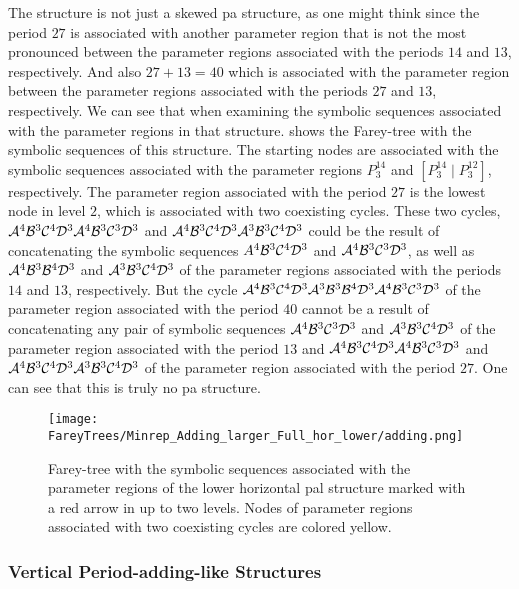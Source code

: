 The structure is not just a skewed \gls{pa} structure, as one might think since the period $27$ is associated with another parameter region that is not the most pronounced between the parameter regions associated with the periods $14$ and $13$, respectively.
And also $27 + 13 = 40$ which is associated with the parameter region between the parameter regions associated with the periods $27$ and $13$, respectively.
We can see that when examining the symbolic sequences associated with the parameter regions in that structure.
 shows the Farey-tree with the symbolic sequences of this structure.
The starting nodes are associated with the symbolic sequences associated with the parameter regions $P^{14}_3$ and $\left[P^{14}_3 \mid P^{12}_3\right]$, respectively.
The parameter region associated with the period $27$ is the lowest node in level $2$, which is associated with two coexisting cycles.
These two cycles, $\mathcal{A}^4\mathcal{B}^3\mathcal{C}^4\mathcal{D}^3\mathcal{A}^4\mathcal{B}^3\mathcal{C}^3\mathcal{D}^3$ and $\mathcal{A}^4\mathcal{B}^3\mathcal{C}^4\mathcal{D}^3\mathcal{A}^3\mathcal{B}^3\mathcal{C}^4\mathcal{D}^3$ could be the result of concatenating the symbolic sequences $A^4\mathcal{B}^3\mathcal{C}^4\mathcal{D}^3$ and $\mathcal{A}^4\mathcal{B}^3\mathcal{C}^3\mathcal{D}^3$, as well as $\mathcal{A}^4\mathcal{B}^3\mathcal{B}^4\mathcal{D}^3$ and $\mathcal{A}^3\mathcal{B}^3\mathcal{C}^4\mathcal{D}^3$ of the parameter regions associated with the periods $14$ and $13$, respectively.
But the cycle $\mathcal{A}^4\mathcal{B}^3\mathcal{C}^4\mathcal{D}^3\mathcal{A}^3\mathcal{B}^3\mathcal{B}^4\mathcal{D}^3\mathcal{A}^4\mathcal{B}^3\mathcal{C}^3\mathcal{D}^3$ of the parameter region associated with the period $40$ cannot be a result of concatenating any pair of symbolic sequences $\mathcal{A}^4\mathcal{B}^3\mathcal{C}^3\mathcal{D}^3$ and $\mathcal{A}^3\mathcal{B}^3\mathcal{C}^4\mathcal{D}^3$ of the parameter region associated with the period $13$ and $\mathcal{A}^4\mathcal{B}^3\mathcal{C}^4\mathcal{D}^3\mathcal{A}^4\mathcal{B}^3\mathcal{C}^3\mathcal{D}^3$ and $\mathcal{A}^4\mathcal{B}^3\mathcal{C}^4\mathcal{D}^3\mathcal{A}^3\mathcal{B}^3\mathcal{C}^4\mathcal{D}^3$ of the parameter region associated with the period $27$.
One can see that this is truly no \gls{pa} structure.


\begin{figure}
	\centering
	\texttt{[image: FareyTrees/Minrep\_Adding\_larger\_Full\_hor\_lower/adding.png]}
	\caption[Farey-tree with the symbolic sequences of a horizontal  structure]{
		Farey-tree with the symbolic sequences associated with the parameter regions of the lower horizontal \gls{pal} structure marked with a red arrow in  up to two levels.
		Nodes of parameter regions associated with two coexisting cycles are colored yellow.
	}
	\label{fig:add.add.like.hor.tree}
\end{figure}

\subsubsection{Vertical Period-adding-like Structures}

